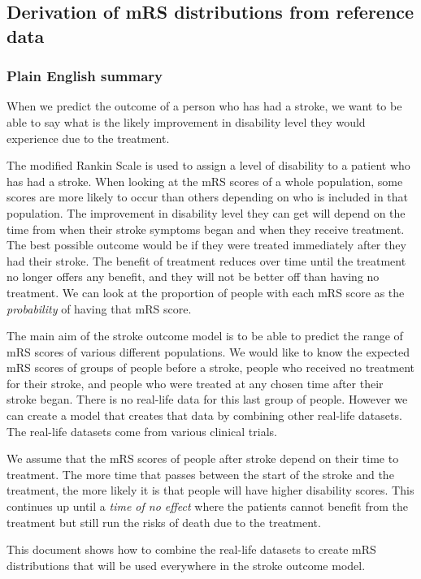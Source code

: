 \subsection{Derivation of mRS distributions from reference data}

\subsubsection{Plain English summary}

When we predict the outcome of a person who has had a stroke, we want to be able to say what is the likely improvement in disability level they would experience due to the treatment.

The modified Rankin Scale is used to assign a level of disability to a patient who has had a stroke. When looking at the mRS scores of a whole population, some scores are more likely to occur than others depending on who is included in that population. The improvement in disability level they can get will depend on the time from when their stroke symptoms began and when they receive treatment. The best possible outcome would be if they were treated immediately after they had their stroke. The benefit of treatment reduces over time until the treatment no longer offers any benefit, and they will not be better off than having no treatment. We can look at the proportion of people with each mRS score as the \emph{probability} of having that mRS score.

The main aim of the stroke outcome model is to be able to predict the range of mRS scores of various different populations. We would like to know the expected mRS scores of groups of people before a stroke, people who received no treatment for their stroke, and people who were treated at any chosen time after their stroke began. There is no real-life data for this last group of people. However we can create a model that creates that data by combining other real-life datasets. The real-life datasets come from various clinical trials.

We assume that the mRS scores of people after stroke depend on their time to treatment. The more time that passes between the start of the stroke and the treatment, the more likely it is that people will have higher disability scores. This continues up until a \emph{time of no effect} where the patients cannot benefit from the treatment but still run the risks of death due to the treatment.

This document shows how to combine the real-life datasets to create mRS distributions that will be used everywhere in the stroke outcome model.

